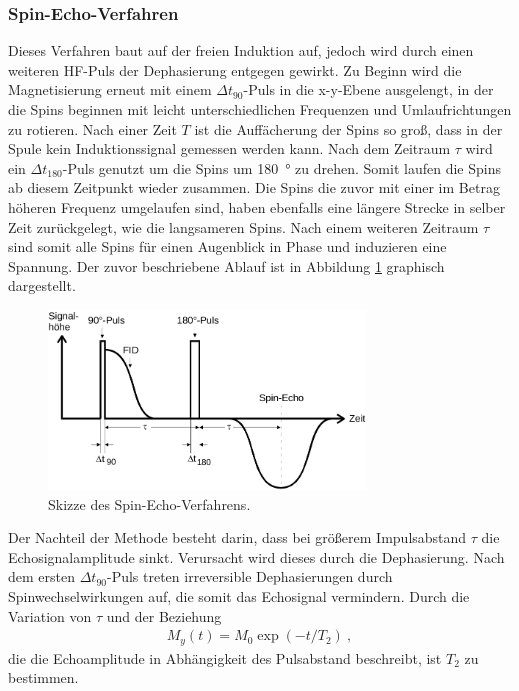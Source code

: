 \subsubsection{Spin-Echo-Verfahren}
Dieses Verfahren baut auf der freien Induktion auf, jedoch wird durch einen weiteren HF-Puls der Dephasierung entgegen gewirkt. Zu Beginn wird die Magnetisierung erneut mit einem $\Delta t_{90}$-Puls in die x-y-Ebene ausgelengt, in der die Spins beginnen mit leicht unterschiedlichen Frequenzen und Umlaufrichtungen zu rotieren. Nach einer Zeit $T$ ist die Auffächerung der Spins so groß, dass in der Spule kein Induktionssignal gemessen werden kann. Nach dem Zeitraum $\tau$  wird ein $\Delta t_{180}$-Puls genutzt um die Spins um \SI{180}{\degree} zu drehen. Somit laufen die Spins ab diesem Zeitpunkt wieder zusammen. Die Spins die zuvor mit einer im Betrag höheren Frequenz umgelaufen sind, haben ebenfalls eine längere Strecke in selber Zeit zurückgelegt, wie die langsameren Spins. Nach einem weiteren Zeitraum $\tau$ sind somit alle Spins für einen Augenblick in Phase und induzieren eine Spannung. Der zuvor beschriebene Ablauf ist in Abbildung \ref{fig:plot2} graphisch dargestellt. 


\begin{figure}
  \centering
  \includegraphics[width=0.75\textwidth]{ressources/hahn_echo.png}
  \caption{Skizze des Spin-Echo-Verfahrens.}
  \label{fig:plot2}
\end{figure}

Der Nachteil der Methode besteht darin, dass bei größerem Impulsabstand $\tau$ die Echosignalamplitude sinkt. Verursacht wird dieses durch die Dephasierung. Nach dem ersten $\Delta t_{90}$-Puls treten irreversible Dephasierungen durch Spinwechselwirkungen auf, die somit das Echosignal vermindern. Durch die Variation von $\tau$ und der Beziehung
\begin{align}
	M_y(t)=M_0\exp{(-t/T_2)} \:,
	\label{eq:11}
\end{align}
die die Echoamplitude in Abhängigkeit des Pulsabstand beschreibt, ist $T_2$ zu bestimmen.

